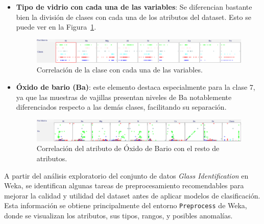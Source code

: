 \documentclass{article}
\begin{document}
\begin{itemize}
    \item \textbf{Tipo de vidrio con cada una de las variables}: Se diferencian bastante bien la división de clases con cada una de los atributos del dataset. Esto se puede ver en la Figura~\ref{fig:class_correlation}.\\

    \begin{figure}[!ht]
        \centering
        \includegraphics[width=1\linewidth]{Imágenes/correlacion_clases.png}
        \caption{Correlación de la clase con cada una de las variables.}
        \label{fig:class_correlation}
    \end{figure}
    
    \item \textbf{Óxido de bario (Ba)}: este elemento destaca especialmente para la clase 7, ya que las muestras de vajillas presentan niveles de Ba notablemente diferenciados respecto a las demás clases, facilitando su separación.\\

    \begin{figure}[!ht]
        \centering
        \includegraphics[width=1\linewidth]{Imágenes/Bario.png}
        \caption{Correlación del atributo de Óxido de Bario con el resto de atributos.}
        \label{fig:bario}
    \end{figure}

\end{itemize}


A partir del análisis exploratorio del conjunto de datos \textit{Glass Identification} en Weka, se identifican algunas tareas de preprocesamiento recomendables para mejorar la calidad y utilidad del dataset antes de aplicar modelos de clasificación. Esta información se obtiene principalmente del entorno \texttt{Preprocess} de Weka, donde se visualizan los atributos, sus tipos, rangos, y posibles anomalías.\\
\end{document}
